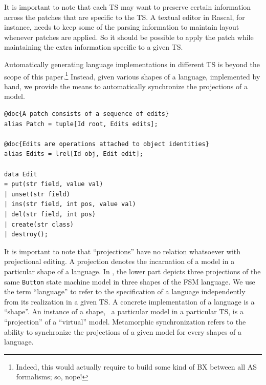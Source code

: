 It is important to note that each TS may want to preserve certain information across the patches that are specific to the TS.
A textual editor in Rascal, for instance, needs to keep some of the parsing information to maintain layout whenever patches are applied.
So it should be possible to apply the patch while maintaining the extra information specific to a given TS.

Automatically generating language implementations in different TS is beyond the scope of this paper.\footnote{Indeed, this would actually require to build some kind of BX between all AS formalisms; so, nope!} Instead, given various shapes of a language, implemented by hand, we provide the means to automatically synchronize the projections of a model.

\begin{lstlisting}[label=lst:delta-adt, caption={CRUD-like \ds structure definition in Rascal}, language=Rascal]
@doc{A patch consists of a sequence of edits}
alias Patch = tuple[Id root, Edits edits];

@doc{Edits are operations attached to object identities}
alias Edits = lrel[Id obj, Edit edit];

data Edit
= put(str field, value val)
| unset(str field)
| ins(str field, int pos, value val)
| del(str field, int pos)
| create(str class) 
| destroy();
\end{lstlisting}

It is important to note that ``projections'' have no relation whatsoever with projectional editing.
A projection denotes the incarnation of a model in a particular shape of a language.
In , the lower part depicts three projections of the same \texttt{Button} state machine model in three shapes of the FSM language.
We use the term ``language'' to refer to the specification of a language independently from its realization in a given TS.
A concrete implementation of a language is a ``shape''.
An instance of a shape, \ie~a particular model in a particular TS, is a ``projection'' of a ``virtual'' model.
Metamorphic synchronization refers to the ability to synchronize the projections of a given model for every shapes of a language.
